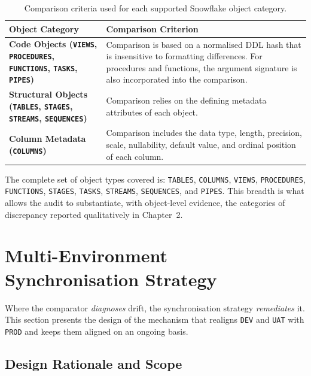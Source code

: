 \begin{table}[H]
\centering
\small
\renewcommand{\arraystretch}{1.45}
\setlength{\tabcolsep}{10pt}
\begin{tabularx}{\textwidth}{
>{\raggedright\arraybackslash\bfseries}p{4.7cm}
X}
\toprule
\rowcolor{ibmblue!15}
\textbf{Object Category} &
\textbf{Comparison Criterion} \\
\midrule
Code Objects (\texttt{VIEWS}, \texttt{PROCEDURES}, \texttt{FUNCTIONS}, \texttt{TASKS}, \texttt{PIPES})
&
Comparison is based on a normalised DDL hash that is insensitive to formatting differences. For procedures and functions, the argument signature is also incorporated into the comparison. \\
Structural Objects (\texttt{TABLES}, \texttt{STAGES}, \texttt{STREAMS}, \texttt{SEQUENCES})
&
Comparison relies on the defining metadata attributes of each object. \\
Column Metadata (\texttt{COLUMNS})
&
Comparison includes the data type, length, precision, scale, nullability, default value, and ordinal position of each column. \\
\bottomrule
\end{tabularx}
\caption{Comparison criteria used for each supported Snowflake object category.}
\label{tab:object-criteria}
\end{table}

The complete set of object types covered is: \texttt{TABLES}, \texttt{COLUMNS}, \texttt{VIEWS}, \texttt{PROCEDURES}, \texttt{FUNCTIONS}, \texttt{STAGES}, \texttt{TASKS}, \texttt{STREAMS}, \texttt{SEQUENCES}, and \texttt{PIPES}. This breadth is what allows the audit to substantiate, with object-level evidence, the categories of discrepancy reported qualitatively in Chapter~2.

\section{Multi-Environment Synchronisation Strategy}
\label{sec:sync}

Where the comparator \emph{diagnoses} drift, the synchronisation strategy \emph{remediates} it. This section presents the design of the mechanism that realigns \texttt{DEV} and \texttt{UAT} with \texttt{PROD} and keeps them aligned on an ongoing basis.

\subsection{Design Rationale and Scope}
\label{subsec:sync-rationale}

